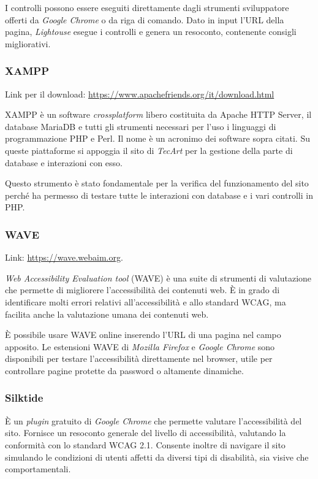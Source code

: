 I controlli possono essere eseguiti direttamente dagli strumenti sviluppatore offerti da \textit{Google Chrome} o da riga di comando. Dato in input l'URL della pagina, \textit{Lightouse} esegue i controlli e genera un resoconto, contenente consigli migliorativi. 


\subsubsection{XAMPP}
\label{test-strumenti-xampp-mamp}
Link per il download: \url{https://www.apachefriends.org/it/download.html}

XAMPP è un software \textit{crossplatform} libero costituita da Apache HTTP Server, il database MariaDB e tutti gli strumenti necessari per l'uso i linguaggi di programmazione PHP e Perl. Il nome è un acronimo dei software sopra citati. Su queste piattaforme si appoggia il sito di \textit{TecArt} per la gestione della parte di database e interazioni con esso.

Questo strumento è stato fondamentale per la verifica del funzionamento del sito perché ha permesso di testare tutte le interazioni con database e i vari controlli in PHP.


\subsubsection{WAVE}
\label{test-strumenti-wave}
Link: \url{https://wave.webaim.org}.

\textit{Web Accessibility Evaluation tool} (WAVE) è una suite di strumenti di valutazione che permette di migliorere l'accessibilità dei contenuti web. È in grado di identificare molti errori relativi all'accessibilità e allo standard WCAG, ma facilita anche la valutazione umana dei contenuti web.

È possibile usare WAVE online inserendo l'URL di una pagina nel campo apposito. Le estensioni WAVE di \textit{Mozilla Firefox} e \textit{Google Chrome} sono disponibili per testare l'accessibilità direttamente nel browser, utile per controllare pagine protette da password o altamente dinamiche. 


\subsubsection{Silktide}
\label{test-strumenti-silktide}
È un \textit{plugin} gratuito di \textit{Google Chrome} che permette valutare l'accessibilità del sito. Fornisce un resoconto generale del livello di accessibilità, valutando la conformità con lo standard WCAG 2.1. Consente inoltre di navigare il sito simulando le condizioni di utenti affetti da diversi tipi di disabilità, sia visive che comportamentali. 


